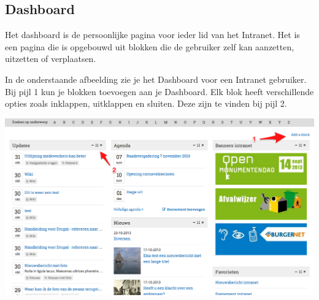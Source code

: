 \subsection{Dashboard}\label{dashboard}
Het dashboard is de persoonlijke pagina voor ieder lid van het Intranet. Het is een pagina die is opgebouwd uit blokken die de gebruiker zelf kan aanzetten, uitzetten of verplaatsen.

In de onderstaande afbeelding zie je het Dashboard voor een Intranet gebruiker. 
Bij pijl 1 kun je blokken toevoegen aan je Dashboard. Elk blok heeft verschillende opties zoals inklappen, uitklappen en sluiten. Deze zijn te vinden bij pijl 2.

\begin{center}
	\includegraphics[width=\textwidth]{img/dashboard.png}
\end{center}